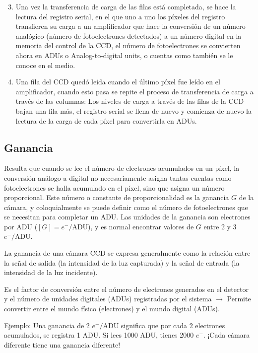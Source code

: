 \documentclass{article}
\begin{document}
\begin{enumerate}
    \setcounter{enumi}{2}
    \item Una vez la transferencia de carga de las filas está completada, se hace la lectura del registro serial, en el que uno a uno los píxeles del registro transfieren su carga a un amplificador que hace la conversión de un número analógico (número de fotoelectrones detectados) a un número digital en la memoria del control de la CCD, el número de fotoelectrones se convierten ahora en ADUs o Analog-to-digital units, o cuentas como también se le conoce en el medio.
    \item Una fila del CCD quedó leída cuando el último píxel fue leído en el amplificador, cuando esto pasa se repite el proceso de transferencia de carga a través de las columnas: Los niveles de carga a través de las filas de la CCD bajan una fila más, el registro serial se llena de nuevo y comienza de nuevo la lectura de la carga de cada píxel para convertirla en ADUs.
\end{enumerate}

\subsection{Ganancia}
Resulta que cuando se lee el número de electrones acumulados en un píxel, la conversión análogo a digital no necesariamente asigna tantas cuentas como fotoelectrones se halla acumulado en el píxel, sino que asigna un número proporcional. Este número o constante de proporcionalidad es la ganancia $G$ de la cámara, y coloquialmente se puede definir como el número de fotoelectrones que se necesitan para completar un ADU. Las unidades de la ganancia son electrones por ADU ($[G] = e^-/\text{ADU}$), y es normal encontrar valores de $G$ entre 2 y 3 $e^-/\text{ADU}$.

La ganancia de una cámara CCD se expresa generalmente como la relación entre la señal de salida (la intensidad de la luz capturada) y la señal de entrada (la intensidad de la luz incidente).

Es el factor de conversión entre el número de electrones generados en el detector y el número de unidades digitales (ADUs) registradas por el sistema $\rightarrow$ Permite convertir entre el mundo físico (electrones) y el mundo digital (ADUs).

Ejemplo: Una ganancia de 2 $e^-/\text{ADU}$ significa que por cada 2 electrones acumulados, se registra 1 ADU. Si lees 1000 ADU, tienes 2000 $e^-$. ¡Cada cámara diferente tiene una ganancia diferente!
\end{document}
